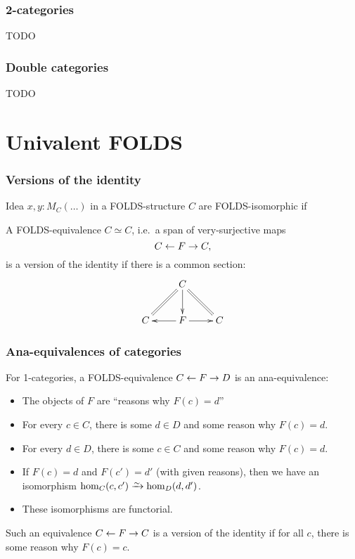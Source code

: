 \documentclass{beamer}
\begin{document}
\begin{frame}
  \frametitle{2-categories}
  TODO
\end{frame}

\begin{frame}
  \frametitle{Double categories}
  TODO
\end{frame}


\section{Univalent FOLDS}
\label{sec:univalent-folds}

\begin{frame}
  \frametitle{Versions of the identity}
  \begin{block}{Idea}
    $x,y:M_C(\dots)$ in a FOLDS-structure $C$ are \alert<1>{FOLDS-isomorphic} if\\ 
  \end{block}
  \pause\pause\pause
  \begin{definition}
    A FOLDS-equivalence $C\simeq C$, i.e.\ a span of very-surjective maps
    \[ C \leftarrow F \to C, \]
    is \alert{a version of the identity} if there is a common section:
    \[ \xymatrix{ &C \ar[d] \ar@{=}[dl] \ar@{=}[dr] \\ C & F \ar[l] \ar[r] & C } \]
  \end{definition}
\end{frame}

\begin{frame}
  \frametitle{Ana-equivalences of categories}
  For 1-categories, a FOLDS-equivalence $C \leftarrow F \to D$ is an \alert<1>{ana-equivalence}:
  \begin{itemize}
  \item The objects of $F$ are ``reasons why $F(c) = d$''
  \item For every $c\in C$, there is some $d\in D$ and some reason why $F(c)=d$.
  \item For every $d\in D$, there is some $c\in C$ and some reason why $F(c)=d$.
  \item If $F(c)=d$ and $F(c')=d'$ (with given reasons), then we have an isomorphism $\hom_C(c,c') \toiso \hom_D(d,d')$.
  \item These isomorphisms are functorial.
  \end{itemize}
  \pause
  Such an equivalence $C \leftarrow F \to C$ is a \alert{version of the identity} if for all $c$, there is some reason why $F(c)=c$.
\end{frame}
\end{document}
